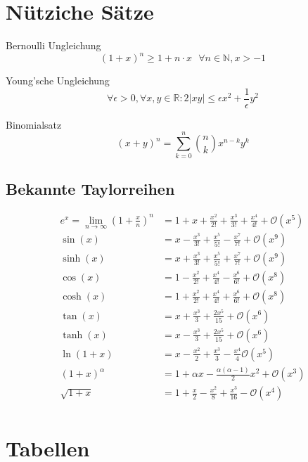 \documentclass[a4paper,8pt]{extarticle}
\def\R{\mathbb{R}}
\begin{document}
\section{Nütziche Sätze}
\begin{subbox}{Bernoulli Ungleichung}
  $$(1 + x)^n \geq 1 + n \cdot x \ \ \ \forall n \in \mathbb{N}, x > -1$$
\end{subbox}

\begin{subbox}{Young'sche Ungleichung}
  $$\forall \epsilon > 0, \forall x, y \in \R: 2|xy| \leq \epsilon x^2 + \frac{1}{\epsilon} y^2$$
\end{subbox}

\begin{subbox}{Binomialsatz}
  $$(x + y)^n = \sum_{k = 0}^n {n \choose k} x^{n-k}y^k$$
\end{subbox}

\subsection{Bekannte Taylorreihen}
\begin{align*}
  e^x = \lim_{n \to \infty} \left(1 + \frac{x}{n} \right)^n & = 1 + x + \frac{x^2}{2!} + \frac{x^3}{3!} + \frac{x^4}{4!} + \mathcal{O}(x^5) \\
  \sin(x) & = x - \frac{x^3}{3!} + \frac{x^5}{5!} - \frac{x^7}{7!} + \mathcal{O}(x^9) \\ 
  \sinh(x) & = x + \frac{x^3}{3!} + \frac{x^5}{5!} + \frac{x^7}{7!} + \mathcal{O}(x^9) \\ 
  \cos(x) & = 1 - \frac{x^2}{2!} + \frac{x^4}{4!} - \frac{x^6}{6!} + \mathcal{O}(x^8) \\  
  \cosh(x) & = 1 + \frac{x^2}{2!} + \frac{x^4}{4!} + \frac{x^6}{6!} + \mathcal{O}(x^8) \\  
  \tan(x) & = x + \frac{x^3}{3} + \frac{2x^5}{15} + \mathcal{O}(x^6) \\ 
  \tanh(x) & = x - \frac{x^3}{3} + \frac{2x^5}{15} + \mathcal{O}(x^6) \\ 
  \ln(1 + x) & = x - \frac{x^2}{2} + \frac{x^3}{3} - \frac{x^4}{4} \mathcal{O}(x^5) \\
  (1 + x)^\alpha & = 1 + \alpha x - \frac{\alpha (\alpha - 1)}{2}x^2 + \mathcal{O}(x^3) \\ 
  \sqrt{1 + x} & = 1 + \frac{x}{2} - \frac{x^2}{8} + \frac{x^3}{16} - \mathcal{O}(x^4) \\
\end{align*}


\section{Tabellen}
\def\limxpi{\lim_{x\to +\infty}}
\def\limxmi{\lim_{x\to -\infty}}
\def\limxi{\lim_{x\to \pm \infty}}
\end{document}
